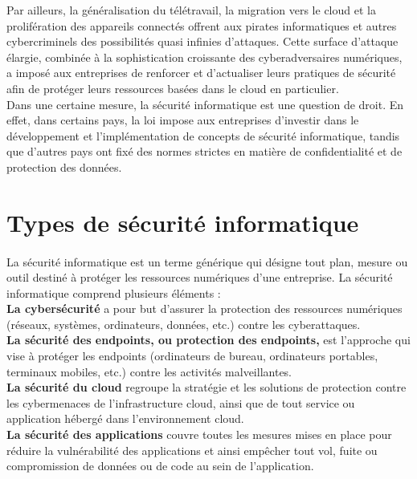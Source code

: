  Par ailleurs, la généralisation du télétravail, la migration vers le cloud et la prolifération des appareils connectés offrent aux pirates informatiques et autres cybercriminels des possibilités quasi infinies d’attaques. Cette surface d’attaque élargie, combinée à la sophistication croissante des cyberadversaires numériques, a imposé aux entreprises de renforcer et d’actualiser leurs pratiques de sécurité afin de protéger leurs ressources basées dans le cloud en particulier.\\
 
 Dans une certaine mesure, la sécurité informatique est une question de droit. En effet, dans certains pays, la loi impose aux entreprises d’investir dans le développement et l’implémentation de concepts de sécurité informatique, tandis que d’autres pays ont fixé des normes strictes en matière de confidentialité et de protection des données.\\
 \section{Types de sécurité informatique}
 \paragraph{ }
 La sécurité informatique est un terme générique qui désigne tout plan, mesure ou outil destiné à protéger les ressources numériques d’une entreprise. La sécurité informatique comprend plusieurs éléments :\\
 
 \textbf{La cybersécurité} a pour but d’assurer la protection des ressources numériques (réseaux, systèmes, ordinateurs, données, etc.) contre les cyberattaques.\\
 
 \textbf{La sécurité des endpoints, ou protection des endpoints,} est l’approche qui vise à protéger les endpoints (ordinateurs de bureau, ordinateurs portables, terminaux mobiles, etc.) contre les activités malveillantes.\\
 
 \textbf{La sécurité du cloud} regroupe la stratégie et les solutions de protection contre les cybermenaces de l’infrastructure cloud, ainsi que de tout service ou application hébergé dans l’environnement cloud.\\
 
 \textbf{La sécurité des applications} couvre toutes les mesures mises en place pour réduire la vulnérabilité des applications et ainsi empêcher tout vol, fuite ou compromission de données ou de code au sein de l’application.\\
 

